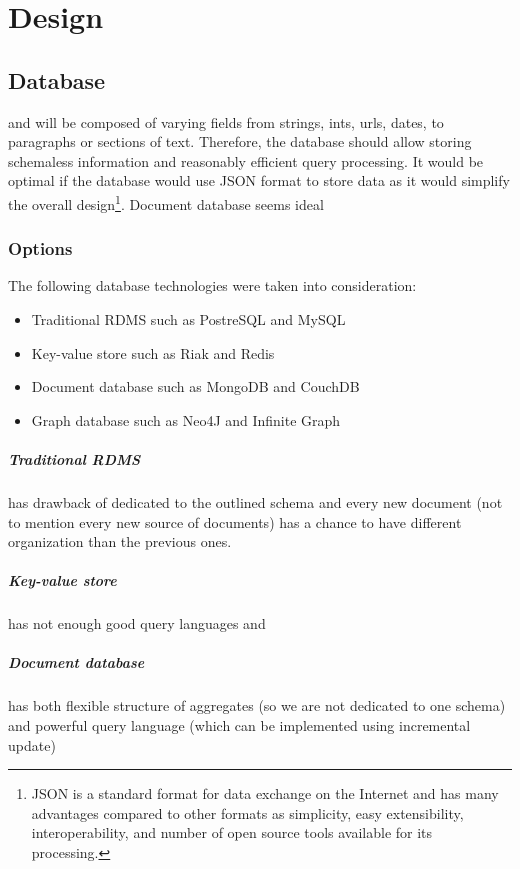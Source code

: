 \documentclass[a4paper]{tufte-book}
\begin{document}
\chapter{Design}

\section{Database}
 and will be composed of varying fields from strings, ints, urls, dates, to paragraphs or sections of text. Therefore, the database should allow storing schemaless information and reasonably efficient query processing. It would be optimal if the database would use JSON format to store data as it would simplify the overall design\footnote{JSON is a standard format for data exchange on the Internet and has many advantages compared to other formats as simplicity, easy extensibility, interoperability, and number of open source tools available for its processing.}.
Document database seems ideal

\subsection{Options}
The following database technologies were taken into consideration:
\begin{itemize}
  \item Traditional RDMS such as PostreSQL and MySQL
  \item Key-value store such as Riak and Redis
  \item Document database such as MongoDB and CouchDB
  \item Graph database such as Neo4J and Infinite Graph
\end{itemize}

\paragraph{Traditional RDMS} has drawback of dedicated to the outlined schema and every new document (not to mention every new source of documents) has a chance to have different organization than the previous ones.

\paragraph{Key-value store} has not enough good query languages and 

\paragraph{Document database} has both flexible structure of aggregates (so we are not dedicated to one schema) and powerful query language (which can be implemented using incremental update)
\end{document}
